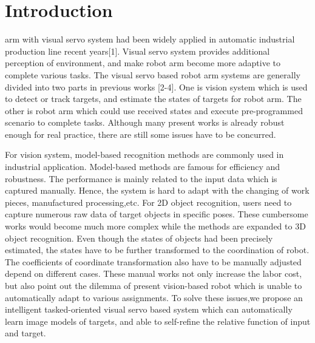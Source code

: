 \documentclass[journal]{IEEEtran}
\begin{document}
%
\IEEEpeerreviewmaketitle



\section{Introduction}


% 
% 
% 
% 
 arm with visual servo system had been widely applied in automatic industrial production line recent years[1]. Visual servo system provides additional perception of environment, and make robot arm become more adaptive to complete various tasks. The visual servo based robot arm systems are generally divided into two parts in previous works [2-4]. One is vision system which is used to detect or track targets, and estimate the states of targets for robot arm. The other is robot arm which could use received states and execute pre-programmed scenario to complete tasks. Although many present works is already robust enough for real practice, there are still some issues have to be concurred. 

For vision system, model-based recognition methods are commonly used in industrial application. Model-based methods are famous for efficiency and robustness. The performance is mainly related to the input data which is captured manually. Hence, the system is hard to adapt with the changing of work pieces, manufactured processing,etc. For 2D object recognition, users need to capture numerous raw data of target objects in specific poses. These cumbersome works would become much more complex while the methods are expanded to 3D object recognition. Even though the states of objects had been precisely estimated, the states have to be further transformed to the coordination of robot. The coefficients of coordinate transformation also have to be manually adjusted depend on different cases. These manual works not only increase the labor cost, but also point out the dilemma of present vision-based robot which is unable to automatically adapt to various assignments. To solve these issues,we propose an intelligent tasked-oriented visual servo based system which can automatically learn image models of targets, and able to self-refine the relative function of input and target.
\end{document}
